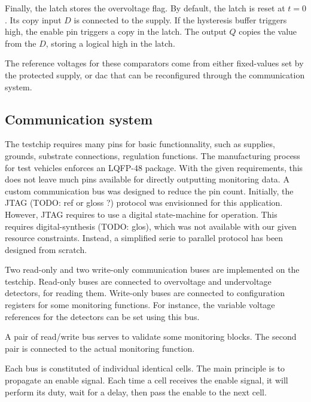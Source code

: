 Finally, the latch stores the overvoltage flag.
By default, the latch is reset at $t=0$.
Its copy input $D$ is connected to the supply.
If the hysteresis buffer triggers high, the enable pin triggers a copy in the latch.
The output $Q$ copies the value from the $D$, storing a logical high in the latch.

The reference voltages for these comparators come from either fixed-values set by the protected supply, or \gls{dac} that can be reconfigured through the communication system.

\subsection{Communication system}
\label{sec:comm-system-testchip}

The testchip requires many pins for basic functionnality, such as supplies, grounds, substrate connections, regulation functions.
The manufacturing process for test vehicles enforces an LQFP-48 package.
With the given requirements, this does not leave much pins available for directly outputting monitoring data.
A custom communication bus was designed to reduce the pin count.
Initially, the JTAG (TODO: ref or gloss ?) protocol was envisionned for this application.
However, JTAG requires to use a digital state-machine for operation.
This requires digital-synthesis (TODO: glos), which was not available with our given resource constraints.
Instead, a simplified serie to parallel protocol has been designed from scratch.

Two read-only and two write-only communication buses are implemented on the testchip.
Read-only buses are connected to overvoltage and undervoltage detectors, for reading them.
Write-only buses are connected to configuration registers for some monitoring functions.
For instance, the variable voltage references for the detectors can be set using this bus.

A pair of read/write bus serves to validate some monitoring blocks.
The second pair is connected to the actual monitoring function.

Each bus is constituted of individual identical cells.
The main principle is to propagate an enable signal.
Each time a cell receives the enable signal, it will perform its duty, wait for a delay, then pass the enable to the next cell.



